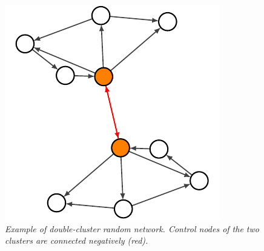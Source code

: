 \begin{figure}
\centering
\includegraphics[scale=1.4]{images/doublecluster.pdf}
\caption{\emph{Example of double-cluster random network. Control nodes of the two clusters are connected negatively (red).}}
\label{fig:doublecluster}
\end{figure}
